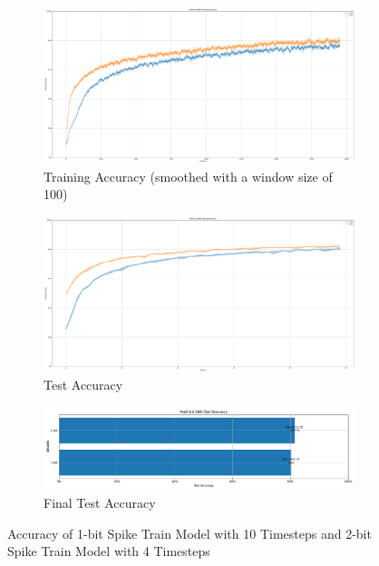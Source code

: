         \begin{figure}[H]
            \centering
            \begin{subfigure}[H]{0.48\textwidth}
                \includegraphics[width=\textwidth]{../timesteps/CIFAR10/plots/cifar10_train_acc.pdf}
                \caption{Training Accuracy (smoothed with a window size of 100)}
            \end{subfigure}
            \hfill
            \begin{subfigure}[H]{0.48\textwidth}
                \includegraphics[width=\textwidth]{../timesteps/CIFAR10/plots/cifar10_test_acc.pdf}
                \caption{Test Accuracy}
            \end{subfigure}
            \hfill
            \begin{subfigure}[H]{\textwidth}
                \includegraphics[width=\textwidth]{../timesteps/CIFAR10/plots/cifar10_final_acc.pdf}
                \caption{Final Test Accuracy}
            \end{subfigure}
            \caption{Accuracy of 1-bit Spike Train Model with 10 Timesteps and 2-bit Spike Train Model with 4 Timesteps}
        \end{figure}

